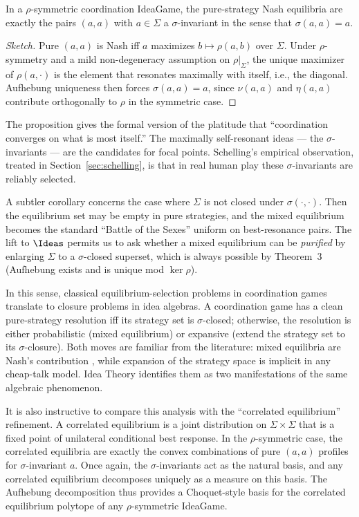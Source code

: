 \begin{proposition}
\label{prop:coord}
In a $\rho$-symmetric coordination IdeaGame, the pure-strategy Nash
equilibria are exactly the pairs $(a,a)$ with $a\in \Sigma$ a
$\sigma$-invariant in the sense that $\sigma(a,a) = a$.
\end{proposition}

\begin{proof}[Sketch]
Pure $(a,a)$ is Nash iff $a$ maximizes $b\mapsto \rho(a,b)$ over $\Sigma$.
Under $\rho$-symmetry and a mild non-degeneracy assumption on
$\rho|_{\Sigma}$, the unique maximizer of $\rho(a,\cdot)$ is the element
that resonates maximally with itself, i.e., the diagonal. Aufhebung
uniqueness then forces $\sigma(a,a)=a$, since $\nu(a,a)$ and $\eta(a,a)$
contribute orthogonally to $\rho$ in the symmetric case.
\end{proof}

The proposition gives the formal version of the platitude that
``coordination converges on what is most itself.'' The maximally
self-resonant ideas — the $\sigma$-invariants — are the candidates for
focal points. Schelling's empirical observation, treated in
Section~\ref{sec:schelling}, is that in real human play these
$\sigma$-invariants are reliably selected.

A subtler corollary concerns the case where $\Sigma$ is not closed under
$\sigma(\cdot,\cdot)$. Then the equilibrium set may be empty in pure
strategies, and the mixed equilibrium becomes the standard ``Battle of
the Sexes'' uniform on best-resonance pairs. The lift to $\Ideas$ permits
us to ask whether a mixed equilibrium can be \emph{purified} by enlarging
$\Sigma$ to a $\sigma$-closed superset, which is always possible by
Theorem~3 (Aufhebung exists and is unique mod $\ker\rho$).

In this sense, classical equilibrium-selection problems in coordination
games translate to closure problems in idea algebras. A coordination
game has a clean pure-strategy resolution iff its strategy set is
$\sigma$-closed; otherwise, the resolution is either probabilistic
(mixed equilibrium) or expansive (extend the strategy set to its
$\sigma$-closure). Both moves are familiar from the literature: mixed
equilibria are Nash's contribution \citep{Nash1950}, while expansion of
the strategy space is implicit in any cheap-talk model. Idea Theory
identifies them as two manifestations of the same algebraic phenomenon.

It is also instructive to compare this analysis with the
``correlated equilibrium'' refinement. A correlated equilibrium is a
joint distribution on $\Sigma\times\Sigma$ that is a fixed point of
unilateral conditional best response. In the $\rho$-symmetric case, the
correlated equilibria are exactly the convex combinations of pure
$(a,a)$ profiles for $\sigma$-invariant $a$. Once again, the
$\sigma$-invariants act as the natural basis, and any correlated
equilibrium decomposes uniquely as a measure on this basis. The
Aufhebung decomposition thus provides a Choquet-style basis for the
correlated equilibrium polytope of any $\rho$-symmetric IdeaGame.

